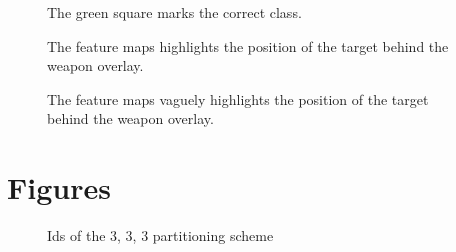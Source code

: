 \begin{figure}[H]
	\begin{center}
	\begin{scriptsize}
		\sffamily
		
	\end{scriptsize}
	\label{fig:hp1}
	\caption[Feature maps image]{The green square marks the correct class.}
	\end{center}
\end{figure}

\begin{figure}[H]
	\begin{center}
	\begin{scriptsize}
		\sffamily
		
	\end{scriptsize}
	\caption[Feature maps]{The feature maps highlights the position of the target behind the weapon overlay.}
	\end{center}
\end{figure}

\begin{figure}[H]
	\begin{center}
	\begin{scriptsize}
		\sffamily
		
	\end{scriptsize}
	\caption[Feature maps]{The feature maps vaguely highlights the position of the target behind the weapon overlay.}
	\end{center}
\end{figure}


\section{Figures}

\begin{figure}[H]
	\begin{scriptsize}
		\sffamily
		\def\svgwidth{\textwidth}
		
	\end{scriptsize}
	\caption{Ids of the 3, 3, 3 partitioning scheme}
	\label{fig:ids}
\end{figure}






